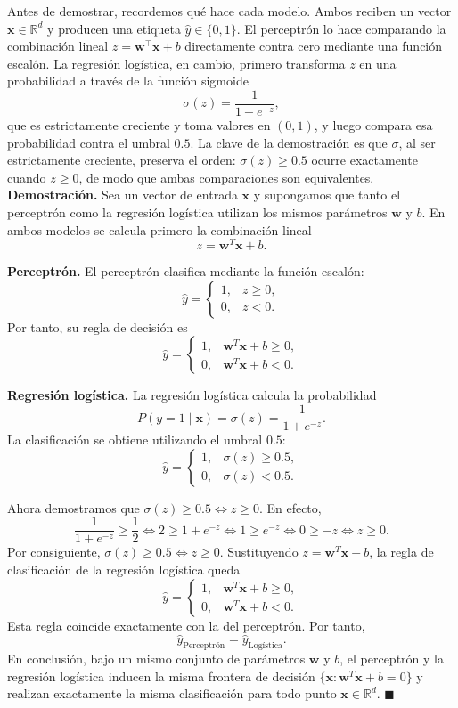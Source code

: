 Antes de demostrar, recordemos qué hace cada modelo. Ambos reciben un vector
$\mathbf{x} \in \mathbb{R}^d$ y producen una etiqueta $\hat{y} \in \{0, 1\}$.
El perceptrón lo hace comparando la combinación lineal $z = \mathbf{w}^\top \mathbf{x} + b$
directamente contra cero mediante una función escalón. La regresión logística, en cambio,
primero transforma $z$ en una probabilidad a través de la función sigmoide
\[
\sigma(z) = \frac{1}{1+e^{-z}},
\]
que es estrictamente creciente y toma valores en $(0,1)$, y luego compara esa
probabilidad contra el umbral $0.5$. La clave de la demostración es que $\sigma$,
al ser estrictamente creciente, preserva el orden: $\sigma(z) \ge 0.5$ ocurre
exactamente cuando $z \ge 0$, de modo que ambas comparaciones son equivalentes.\\

\textbf{Demostración.} Sea un vector de entrada $\mathbf{x}$ y supongamos que tanto
el perceptrón como la regresión logística utilizan los mismos parámetros $\mathbf{w}$
y $b$. En ambos modelos se calcula primero la combinación lineal
\[
z = \mathbf{w}^T \mathbf{x} + b.
\]

\textbf{Perceptrón.} El perceptrón clasifica mediante la función escalón:
\[
\hat{y} =
\begin{cases}
1, & z \ge 0, \\
0, & z < 0.
\end{cases}
\]
Por tanto, su regla de decisión es
\[
\hat{y} =
\begin{cases}
1, & \mathbf{w}^T\mathbf{x} + b \ge 0, \\
0, & \mathbf{w}^T\mathbf{x} + b < 0.
\end{cases}
\]

\textbf{Regresión logística.} La regresión logística calcula la probabilidad
\[
P(y=1 \mid \mathbf{x}) = \sigma(z) = \frac{1}{1+e^{-z}}.
\]
La clasificación se obtiene utilizando el umbral $0.5$:
\[
\hat{y} =
\begin{cases}
1, & \sigma(z) \ge 0.5, \\
0, & \sigma(z) < 0.5.
\end{cases}
\]

Ahora demostramos que $\sigma(z) \ge 0.5 \iff z \ge 0$. En efecto,
\[
\frac{1}{1+e^{-z}} \ge \frac{1}{2}
\iff
2 \ge 1 + e^{-z}
\iff
1 \ge e^{-z}
\iff
0 \ge -z
\iff
z \ge 0.
\]
Por consiguiente, $\sigma(z) \ge 0.5 \iff z \ge 0$. Sustituyendo
$z = \mathbf{w}^T\mathbf{x} + b$, la regla de clasificación de la regresión
logística queda
\[
\hat{y} =
\begin{cases}
1, & \mathbf{w}^T\mathbf{x} + b \ge 0, \\
0, & \mathbf{w}^T\mathbf{x} + b < 0.
\end{cases}
\]
Esta regla coincide exactamente con la del perceptrón. Por tanto,
\[
\hat{y}_{\text{Perceptrón}} = \hat{y}_{\text{Logística}}.
\]
En conclusión, bajo un mismo conjunto de parámetros $\mathbf{w}$ y $b$, el perceptrón
y la regresión logística inducen la misma frontera de decisión $\{\mathbf{x} :
\mathbf{w}^T\mathbf{x} + b = 0\}$ y realizan exactamente la misma clasificación
para todo punto $\mathbf{x} \in \mathbb{R}^d$. \hfill$\blacksquare$
